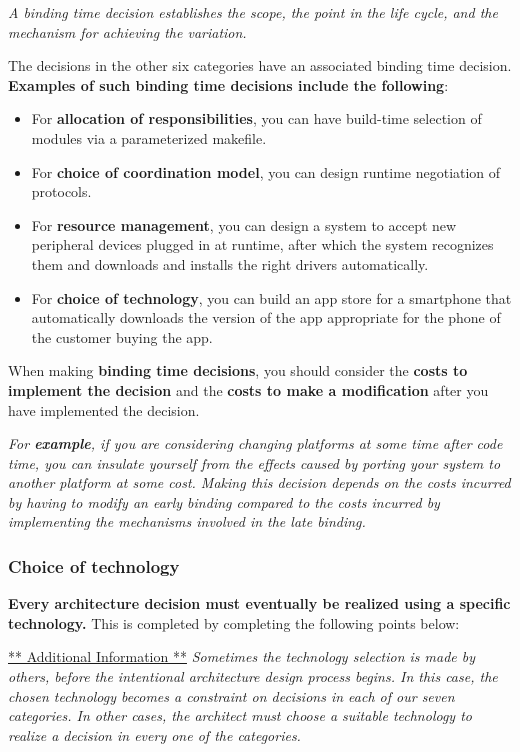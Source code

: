 \documentclass[a4paper]{article}
\begin{document}
\textit{A binding time decision establishes the scope, the point in the life cycle, and the mechanism for achieving the variation.}

The decisions in the other six categories have an associated binding time decision. \textbf{Examples of such binding time decisions include the following}:

\begin{itemize}
\item For \textbf{allocation of responsibilities}, you can have build-time selection of modules via a parameterized makefile.

\item For \textbf{choice of coordination model}, you can design runtime negotiation of protocols.

\item For \textbf{resource management}, you can design a system to accept new peripheral devices plugged in at runtime, after which the system recognizes them and downloads and installs the right drivers automatically.

\item For \textbf{choice of technology}, you can build an app store for a smartphone that automatically downloads the version of the app appropriate for the phone of the customer buying the app.\\
\end{itemize}


When making \textbf{binding time decisions}, you should consider the \textbf{costs to implement the decision} and the \textbf{costs to make a modification} after you have implemented the decision. 

\textit{For \textbf{example}, if you are considering changing platforms at some time after code time, you can insulate yourself from the effects caused by porting your system to another platform at some cost. Making this decision depends on the costs incurred by having to modify an early binding compared to the costs incurred by implementing the mechanisms involved in the late binding.}

\subsubsection{Choice of technology}

\textbf{Every architecture decision must eventually be realized using a specific technology.} This is completed by completing the following points below:

\underline{** Additional Information **}
\textit{Sometimes the technology selection is made by others, before the intentional architecture design process begins. In this case, the chosen technology becomes a constraint on decisions in each of our seven categories. In other cases, the architect must choose a suitable technology to realize a decision in every one of the categories.}\\\\
\end{document}

